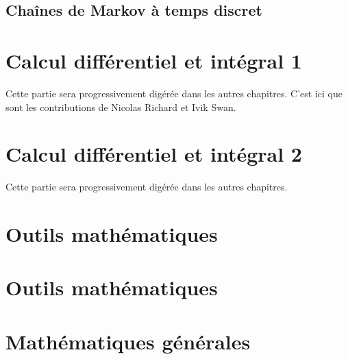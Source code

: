 \chapter{Chaînes de Markov à temps discret}


\part{Calcul différentiel et intégral 1}
Cette partie sera progressivement digérée dans les autres chapitres. C'est ici que sont les contributions de Nicolas Richard et Ivik Swan.


\part{Calcul différentiel et intégral 2}
Cette partie sera progressivement digérée dans les autres chapitres. 


\part{Outils mathématiques}


\part{Outils mathématiques}


\part{Mathématiques générales}







    \printnomenclature
    \printindex






